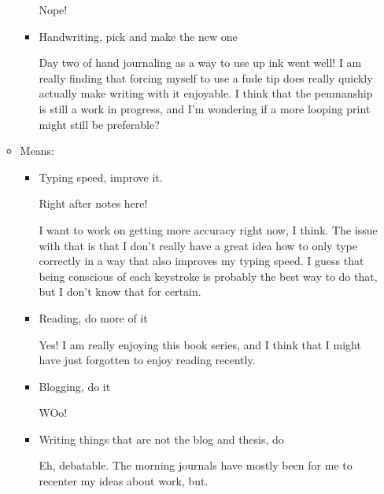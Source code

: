 \documentclass[12pt]{article}
\renewcommand{\,}{\textsuperscript{,}}
\begin{document}
\begin{itemize}
\begin{itemize}
\begin{itemize}
Nope!

\item Handwriting, pick and make the new one

Day two of hand journaling as a way to use up ink went well!  
I am really finding that forcing myself to use a fude tip does really quickly actually make writing with it enjoyable.  
I think that the penmanship is still a work in progress, and I'm wondering if a more looping print might still be preferable?

\end{itemize}

\item Means:

\begin{itemize}

\item Typing speed, improve it.

Right after notes here!

I want to work on getting more accuracy right now, I think.  
The issue with that is that I don't really have a great idea how to only type correctly in a way that also improves my typing speed.  
I guess that being conscious of each keystroke is probably the best way to do that, but I don't know that for certain.

\item Reading, do more of it

Yes! I am really enjoying this book series, and I think that I might have just forgotten to enjoy reading recently.

\item Blogging, do it

WOo!

\item Writing things that are not the blog and thesis, do

Eh, debatable. The morning journals have mostly been for me to recenter my ideas about work, but.

\end{itemize}

\end{itemize}

\end{itemize}
\end{document}
